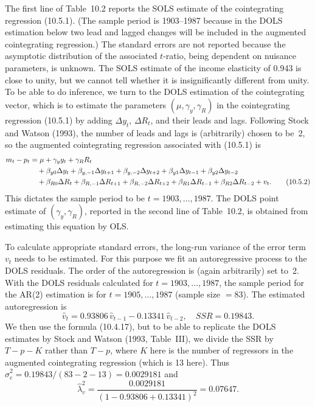 The first line of Table~10.2 reports the SOLS estimate of the cointegrating regres\-sion
(10.5.1). (The sample period is 1903--1987 because in the DOLS estimation
below two lead and lagged changes will be included in the augmented cointegrating
regression.) The standard errors are not reported because the asymptotic distribu\-tion
of the associated $t$-ratio, being dependent on nuisance parameters, is unknown.
The SOLS estimate of the income elasticity of 0.943 is close to unity, but we can\-not
tell whether it is insignificantly different from unity. To be able to do inference,
we turn to the DOLS estimation of the cointegrating vector, which is to estimate
the parameters $(\mu, \gamma_y, \gamma_R)$ in the cointegrating regression (10.5.1) by adding $\Delta y_t$,
$\Delta R_t$, and their leads and lags. Following Stock and Watson (1993), the number
of leads and lags is (arbitrarily) chosen to be~2, so the augmented cointegrating
regression associated with (10.5.1) is
\begin{align}
  m_t - p_t
  &= \mu + \gamma_y y_t + \gamma_R R_t
  \notag \\
  &\quad + \beta_{y0} \Delta y_t
    + \beta_{y,-1} \Delta y_{t+1} + \beta_{y,-2} \Delta y_{t+2}
    + \beta_{y1} \Delta y_{t-1} + \beta_{y2} \Delta y_{t-2}
  \notag \\
  &\quad + \beta_{R0} \Delta R_t
    + \beta_{R,-1} \Delta R_{t+1} + \beta_{R,-2} \Delta R_{t+2}
    + \beta_{R1} \Delta R_{t-1} + \beta_{R2} \Delta R_{t-2}
    + v_t.
  \label{eq:10.5.2} \tag{10.5.2}
\end{align}
This dictates the sample period to be $t = 1903, \ldots, 1987$. The DOLS point esti\-mate
of $(\gamma_y, \gamma_R)$, reported in the second line of Table~10.2, is obtained from esti\-mating
this equation by OLS.

To calculate appropriate standard errors, the long-run variance of the error term
$v_t$ needs to be estimated. For this purpose we fit an autoregressive process to the
DOLS residuals. The order of the autoregression is (again arbitrarily) set to~2. With
the DOLS residuals calculated for $t = 1903, \ldots, 1987$, the sample period for the
AR(2) estimation is for $t = 1905, \ldots, 1987$ (sample size $= 83$). The estimated
autoregression is
\begin{equation}
  \hat{v}_t = 0.93806\, \hat{v}_{t-1} - 0.13341\, \hat{v}_{t-2},
  \quad SSR = 0.19843.
  \label{eq:10.5.3} \tag{10.5.3}
\end{equation}
We then use the formula (10.4.17), but to be able to replicate the DOLS estimates
by Stock and Watson (1993, Table~III), we divide the SSR by $T - p - K$ rather
than $T - p$, where $K$ here is the number of regressors in the
augmented cointegrating regression (which is 13 here). Thus
$\hat{\sigma}_e^2 = 0.19843/(83 - 2 - 13) = 0.0029181$ and
\begin{equation}
  \hat{\lambda}_v^2
  = \frac{0.0029181}{(1 - 0.93806 + 0.13341)^2}
  = 0.07647.
  \label{eq:10.5.4} \tag{10.5.4}
\end{equation}

